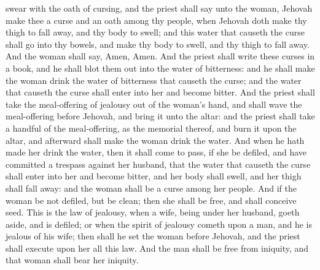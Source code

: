 swear with the oath of cursing, and the priest shall say unto the woman, Jehovah make thee a curse and an oath among thy people, when Jehovah doth make thy thigh to fall away, and thy body to swell; and this water that causeth the curse shall go into thy bowels, and make thy body to swell, and thy thigh to fall away. And the woman shall say, Amen, Amen.  And the priest shall write these curses in a book, and he shall blot them out into the water of bitterness: and he shall make the woman drink the water of bitterness that causeth the curse; and the water that causeth the curse shall enter into her and become bitter. And the priest shall take the meal-offering of jealousy out of the woman’s hand, and shall wave the meal-offering before Jehovah, and bring it unto the altar: and the priest shall take a handful of the meal-offering, as the memorial thereof, and burn it upon the altar, and afterward shall make the woman drink the water. And when he hath made her drink the water, then it shall come to pass, if she be defiled, and have committed a trespass against her husband, that the water that causeth the curse shall enter into her and become bitter, and her body shall swell, and her thigh shall fall away: and the woman shall be a curse among her people. And if the woman be not defiled, but be clean; then she shall be free, and shall conceive seed.  This is the law of jealousy, when a wife, being under her husband, goeth aside, and is defiled; or when the spirit of jealousy cometh upon a man, and he is jealous of his wife; then shall he set the woman before Jehovah, and the priest shall execute upon her all this law. And the man shall be free from iniquity, and that woman shall bear her iniquity. 

